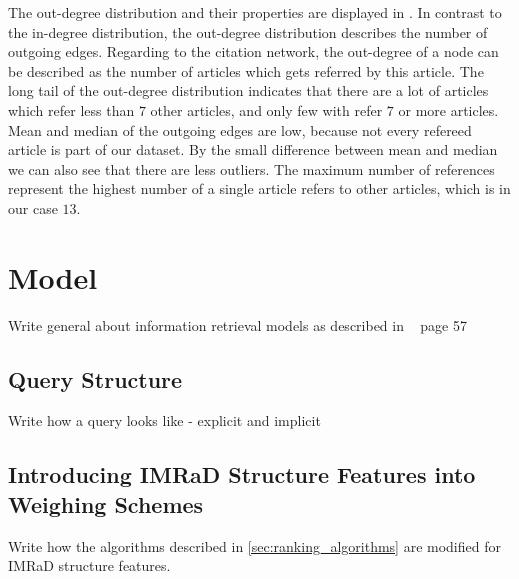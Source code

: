The out-degree distribution and their properties are displayed in . In contrast to the in-degree distribution, the out-degree distribution describes the number of outgoing edges. Regarding to the citation network, the out-degree of a node can be described as the number of articles which gets referred by this article. The long tail of the out-degree distribution indicates that there are a lot of articles which refer less than $7$ other articles, and only few with refer $7$ or more articles. Mean and median of the outgoing edges are low, because not every refereed article is part of our dataset. By the small difference between mean and median we can also see that there are less outliers. The maximum number of references represent the highest number of a single article refers to other articles, which is in our case $13$.

\section{Model}
\label{sec:model}

Write general about information retrieval models as described in ~\cite{ModernInvormationRetrieval1999} page 57

\subsection{Query Structure}

Write how a query looks like - explicit and implicit

\subsection{Introducing IMRaD Structure Features into Weighing Schemes}

Write how the algorithms described in \cref{sec:ranking_algorithms} are modified for IMRaD structure features.
